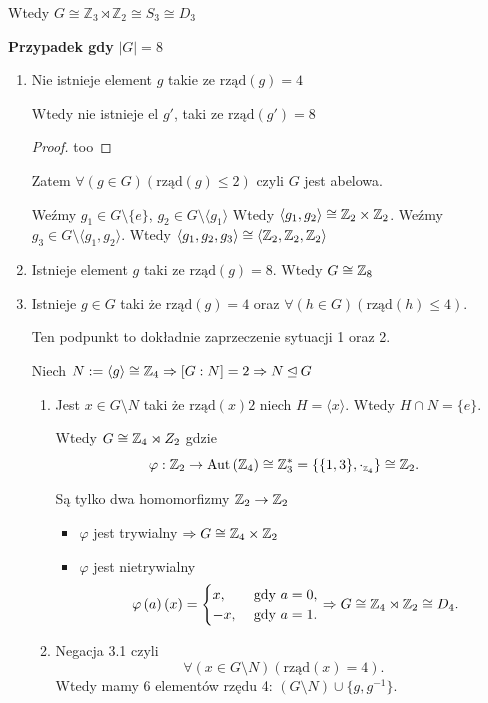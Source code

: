 \begin{enumerate}[label=\arabic*.]
\begin{itemize}
			Wtedy $G\cong \mathbb{Z}_3\rtimes\mathbb{Z}_2 \cong S_{3} \cong D_{3}$
		\end{itemize}
\end{enumerate}

\textbf{Przypadek gdy} $\left| G \right| = 8$
\begin{enumerate}[label=\arabic*.]
	\item Nie istnieje element $g$ takie ze $\text{rząd}\left( g \right) =4$ 
		\begin{fact}
		Wtedy nie istnieje el $g'$, taki ze $\text{rząd}\left( g' \right) = 8$
		\end{fact}
		\begin{proof}
			too
		\end{proof} 

		Zatem $\forall\left(g\in G\right)\left( \text{rząd}\left( g \right) \le 2 \right)  $ czyli $G$ jest abelowa.

		Weźmy $g_1\in G\setminus \{e\} $, $g_2\in G\setminus \langle g_1 \rangle $ 
		Wtedy $\langle g_1,g_2 \rangle \cong \mathbb{Z}_2\times \mathbb{Z}_2$.
		Weźmy $g_3\in G\setminus \langle g_1,g_2 \rangle $. Wtedy $\langle g_1,g_2,g_3 \rangle \cong \langle \mathbb{Z}_2,\mathbb{Z}_2,\mathbb{Z}_2 \rangle $
	\item Istnieje element $g$ taki ze $\text{rząd}\left(  g\right) = 8$. Wtedy $G\cong\mathbb{Z}_8$
	\item Istnieje $g\in G$ taki że $\text{rząd}\left( g \right) = 4$ oraz $\forall\left(h\in G\right) \left( \text{rząd}\left( h \right) \le 4 \right). $ 

		Ten podpunkt to dokładnie zaprzeczenie sytuacji 1 oraz 2. 

		Niech $N:= \langle g \rangle \cong\mathbb{Z}_4 \Rightarrow [G:N] = 2 \Rightarrow N\unlhd G$
		\begin{enumerate}[label=\theenumi\arabic*., ref=\theenumi.\arabic*]
			\item Jest $x\in G\setminus N$ taki że $\text{rząd}\left( x \right) 2$
				niech $H = \langle x \rangle $. Wtedy $H\cap N = \{e\} $.

				Wtedy $G\cong\mathbb{Z}_4 \rtimes Z_2$ gdzie 
				\[
				\varphi : \mathbb{Z}_2 \to \operatorname{Aut}\left(\mathbb{Z}_4\right) \cong \mathbb{Z}_3^{*}= \{ \{1,3\} , \cdot _{\scriptscriptstyle \mathbb{Z}_4}\} \cong\mathbb{Z}_2
				.\] 

				Są tylko dwa homomorfizmy $\mathbb{Z}_2\to \mathbb{Z}_2$
				\begin{itemize}
					\item $ \varphi$ jest trywialny $\Rightarrow G \cong \mathbb{Z}_4 \times \mathbb{Z}_2$
					\item $\varphi$ jest nietrywialny
						\[
						\varphi\left( a \right) \left( x \right) = \begin{cases}
							x, &\text{ gdy } a = 0, \\
							-x, & \text{ gdy } a = 1.
						\end{cases} \Rightarrow G\cong \mathbb{Z}_4 \rtimes \mathbb{Z}_2 \cong D_{4}
						.\] 
				\end{itemize}
			\item Negacja 3.1 czyli
				\[
				\forall\left(x\in G\setminus N\right)\left( \text{rząd}\left( x \right) = 4 \right)  
				.\] 
				Wtedy mamy 6 elementów rzędu 4: $\left( G\setminus N \right) \cup \{g,g^{-1}\} $.
				

\end{enumerate}
\end{enumerate}
